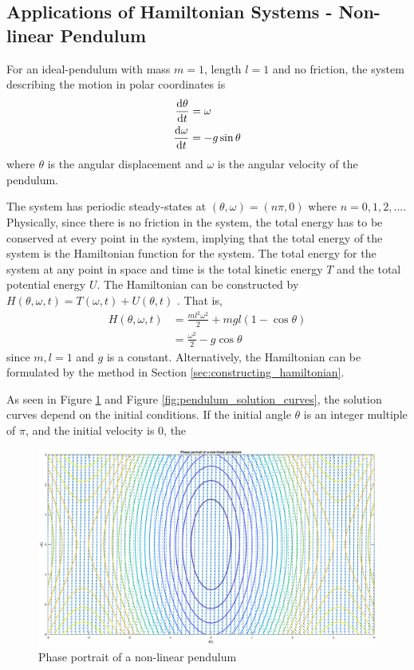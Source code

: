 \documentclass[12pt,1in]{article}
\begin{document}
\subsection{Applications of Hamiltonian Systems - Non-linear Pendulum}
For an ideal-pendulum with mass $m = 1$, length $l = 1$ and no friction, the system describing the motion in polar coordinates is 
\begin{align}
\derivative{\theta}{t} &= \omega \\
\derivative{\omega}{t} &= -g \sin\theta
\end{align}  
where $\theta$ is the angular displacement and $\omega$ is the angular velocity of the pendulum. 

The system has periodic steady-states at $(\theta, \omega ) = (n\pi , 0)$ where $n = 0,1,2,\ldots$. Physically, since there is no friction in the system, the total energy has to be conserved at every point in the system, implying that the total energy of the system is the Hamiltonian function for the system. The total energy for the system at any point in space and time is the total kinetic energy $T$ and the total potential energy $U$. The Hamiltonian can be constructed by $H(\theta, \omega, t) = T(\omega, t) + U(\theta, t)$ \cite{engr_math}. That is,
\begin{align}
H(\theta,\omega, t) &= \frac{m l^2 \omega^2}{2} + mgl(1 - \cos\theta) \\
&= \frac{\omega^2}{2} - g\cos\theta
\end{align}
since $m,l = 1$ and $g$ is a constant. Alternatively, the Hamiltonian can be formulated by the method in Section \ref{sec:constructing_hamiltonian}. 

As seen in Figure \ref{fig:pendulum_phase} and Figure \ref{fig:pendulum_solution_curves}, the solution curves depend on the initial conditions. If the initial angle $\theta$ is an integer multiple of $\pi$, and the initial velocity is $0$, the 
\begin{figure}[H]
	\centering
	\includegraphics[trim={2in 0 1.5in 0}, width=\linewidth]{Figures/pendulum_phase}
	\caption{Phase portrait of a non-linear pendulum}
	\label{fig:pendulum_phase}
\end{figure}
\end{document}
